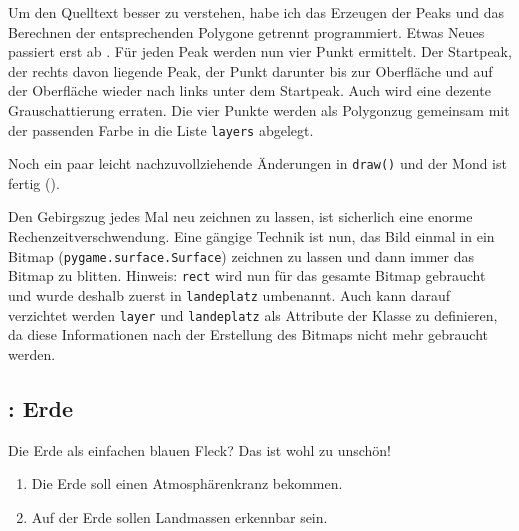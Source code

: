 Um den Quelltext besser zu verstehen, habe ich das Erzeugen der Peaks und das Berechnen der entsprechenden Polygone getrennt programmiert. Etwas Neues passiert erst ab . Für jeden Peak werden nun vier Punkt ermittelt. Der Startpeak, der rechts davon liegende Peak, der Punkt darunter bis zur Oberfläche und auf der Oberfläche wieder nach links unter dem Startpeak. Auch wird eine dezente Grauschattierung erraten. Die vier Punkte werden als Polygonzug gemeinsam mit der passenden Farbe in die Liste \texttt{layers} abgelegt.


Noch ein paar leicht nachzuvollziehende Änderungen in \texttt{draw()} und der Mond ist fertig ().


Den Gebirgszug jedes Mal neu zeichnen zu lassen, ist sicherlich eine enorme Rechenzeitverschwendung. Eine gängige Technik ist nun, das Bild einmal in ein Bitmap (\texttt{py\-game.sur\-face.Sur\-face}) zeichnen zu lassen und dann immer das Bitmap zu blitten. Hinweis: \texttt{rect} wird nun für das gesamte Bitmap gebraucht und wurde deshalb zuerst in \texttt{landeplatz} umbenannt. Auch kann darauf verzichtet werden \texttt{layer} und \texttt{landeplatz} als Attribute der Klasse zu definieren, da diese Informationen nach der Erstellung des Bitmaps nicht mehr gebraucht werden.




\subsection{: Erde}

Die Erde als einfachen blauen Fleck? Das ist wohl zu unschön! 

\begin{enumerate}
	\item Die Erde soll einen Atmosphärenkranz bekommen.\label{reqEarthKranz}
	\item Auf der Erde sollen Landmassen erkennbar sein.\label{reqEarthLand}
\end{enumerate}
\er

